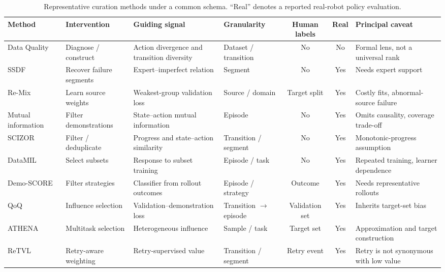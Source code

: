 \begin{table}[t]
\centering
\caption{Representative curation methods under a common schema. ``Real'' denotes a reported real-robot policy evaluation.}
\label{tab:curation-comparison}
\scriptsize
\setlength{\tabcolsep}{3.5pt}
\renewcommand{\arraystretch}{1.08}
\begin{tabularx}{\textwidth}{@{}p{2.25cm}p{2.05cm}p{2.8cm}p{1.6cm}ccX@{}}
\toprule
Method & Intervention & Guiding signal & Granularity & Human labels & Real & Principal caveat \\
\midrule
Data Quality~\cite{belkhale2023data_2306_02437} & Diagnose / construct & Action divergence and transition diversity & Dataset / transition & No & No & Formal lens, not a universal rank \\
SSDF~\cite{wu2024learning_2401_08957} & Recover failure segments & Expert--imperfect relation & Segment & No & Yes & Needs expert support \\
Re-Mix~\cite{hejna2024re_2408_14037} & Learn source weights & Weakest-group validation loss & Source / domain & Target split & Yes & Costly fits, abnormal-source failure \\
Mutual information~\cite{hejna2025robot_2502_08623} & Filter demonstrations & State--action mutual information & Episode & No & Yes & Omits causality, coverage trade-off \\
SCIZOR~\cite{zhang2025scizor_2505_22626} & Filter / deduplicate & Progress and state--action similarity & Transition / segment & No & Yes & Monotonic-progress assumption \\
DataMIL~\cite{dass2025datamil_2505_09603} & Select subsets & Response to subset training & Episode / task & No & Yes & Repeated training, learner dependence \\
Demo-SCORE~\cite{chen2025curating_2503_03707} & Filter strategies & Classifier from rollout outcomes & Episode / strategy & Outcome & Yes & Needs representative rollouts \\
QoQ~\cite{lee2026quality_2603_09056} & Influence selection & Validation--demonstration loss & Transition $\to$ episode & Validation set & Yes & Inherits target-set bias \\
ATHENA~\cite{xu2026athena_2606_16208} & Multitask selection & Heterogeneous influence & Sample / task & Target set & Yes & Approximation and target construction \\
ReTVL~\cite{qin2026beyond_2606_24633} & Retry-aware weighting & Retry-supervised value & Transition / segment & Retry event & Yes & Retry is not synonymous with low value \\
\bottomrule
\end{tabularx}
\end{table}
